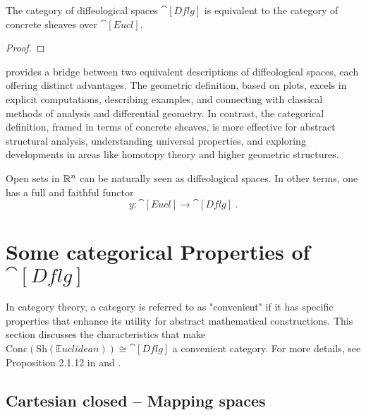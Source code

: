 \documentclass[a4paper,11pt]{article}  %
\newcommand{\Eucl}{\cat[Eucl]}
\newcommand{\Dflg}{\cat[Dflg]}
\begin{document}
\begin{theorem}\label{thm:diffeological-as-sheaves}
	The category of diffeological spaces $\Dflg$ is equivalent to the category of concrete sheaves over $\Eucl$.
\end{theorem}
\begin{proof}
	\vspace{5em}
\end{proof}
%
 provides a bridge between two equivalent descriptions of diffeological spaces, each offering distinct advantages. 
The geometric definition, based on plots, excels in explicit computations, describing examples, and connecting with classical methods of analysis and differential geometry. 
In contrast, the categorical definition, framed in terms of concrete sheaves, is more effective for abstract structural analysis, understanding universal properties, and exploring developments in areas like homotopy theory and higher geometric structures.

\begin{remark}
	Open sets in $\mathbb{R}^n$ can be naturally seen as diffeological spaces.
	In other terms, one has a full and faithful functor\cite[Prop. 2.1.14]{Blohmann24}
	$$ y:\Eucl \to \Dflg~.$$
\end{remark}

\clearpage
\section{Some categorical Properties of $\Dflg$}
%
In category theory, a category is referred to as "convenient" if it has specific properties that enhance its utility for abstract mathematical constructions. 
This section discusses the characteristics that make \(\mathrm{Conc}(\mathrm{Sh}(\mathbb{E}uclidean)) \cong \Dflg\) a convenient category. 
For more details, see Proposition 2.1.12 in \cite{Blohmann24} and \cite{Baez2011}.

\subsection{Cartesian closed -- Mapping spaces}
%
\end{document}
